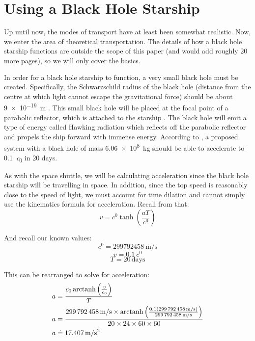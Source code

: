 \section{Using a Black Hole Starship}
	Up until now, the modes of transport have at least been somewhat realistic.
	Now, we enter the area of theoretical transportation. The details of how a black hole starship functions are outside the scope of this paper (and would add roughly 20 more pages), so we will only cover the basics.
	
	In order for a black hole starship to function, a very small black hole must be created.
	Specifically, the Schwarzschild radius of the black hole (distance from the centre at which light cannot escape the gravitational force) should be about \SI{9e-19}{\metre} \autocite{blackHoleStarship}.
	This small black hole will be placed at the focal point of a parabolic reflector, which is attached to the starship \autocite{blackHoleStarship}.
	The black hole will emit a type of energy called Hawking radiation which reflects off the parabolic reflector and propels the ship forward with immense energy.
	According to \cite{blackHoleStarship}, a proposed system with a black hole of mass \SI{6.06e8}{\kg} should be able to accelerate to \SI{0.1}{\clight} in 20 days. 
	
	As with the space shuttle, we will be calculating acceleration since the black hole starship will be travelling in space.
	In addition, since the top speed is reasonably close to the speed of light, we must account for time dilation and cannot simply use the kinematics formula for acceleration.
	Recall from \cite{sracceleration} that:
	\[v = \si{\clight} \tanh \left(\frac{aT}{\si{\clight}}\right)\]

	And recall our known values:
	\[\si{\clight} = \SI{299792458}{\metre/\second}\]
	\[v = \SI{0.1}{\clight}\]
	\[T = 20\,\text{days}\]

	This can be rearranged to solve for acceleration:
	\begin{align*}
		a &= \frac{\si{\clight} \arctanh \left(\frac{v}{\si{\clight}}\right)}{T}\\
		a &= \frac{\SI{299792458}{\metre/\second} \times \arctanh \left(\frac{0.1(\SI{299792458}{\metre/\second})}{\SI{299792458}{\metre/\second}}\right)}{20 \times 24 \times 60 \times 60}\\
		a &\doteq \SI{17.407}{\metre/\second^2}
	\end{align*}
